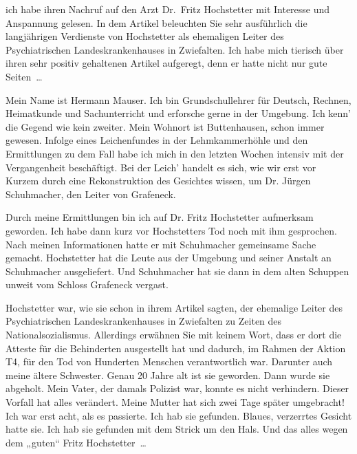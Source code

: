 ich habe ihren Nachruf auf den Arzt Dr.~Fritz Hochstetter mit Interesse und Anspannung gelesen. In
dem Artikel beleuchten Sie sehr ausführlich die langjährigen Verdienste von Hochstetter als
ehemaligen Leiter des Psychiatrischen Landeskrankenhauses in Zwiefalten. Ich habe mich tierisch über
ihren sehr positiv gehaltenen Artikel aufgeregt, denn er hatte nicht nur gute Seiten~…

Mein Name ist Hermann Mauser. Ich bin Grundschullehrer für Deutsch, Rechnen,
Heimatkunde und Sachunterricht und erforsche gerne in der Umgebung.
Ich kenn’ die Gegend wie kein zweiter. Mein Wohnort ist Buttenhausen, schon immer gewesen.
Infolge eines Leichenfundes in der Lehmkammerhöhle
und den Ermittlungen zu dem Fall habe ich mich in den letzten Wochen intensiv mit der Vergangenheit
beschäftigt. Bei der Leich’ handelt es sich, wie wir erst vor Kurzem durch eine Rekonstruktion des
Gesichtes wissen, um Dr. Jürgen Schuhmacher, den Leiter von Grafeneck.

Durch meine Ermittlungen bin ich auf Dr. Fritz Hochstetter aufmerksam geworden. Ich habe dann kurz
vor Hochstetters Tod noch mit ihm gesprochen. Nach meinen Informationen hatte er mit Schuhmacher
gemeinsame Sache gemacht. Hochstetter hat die Leute aus der Umgebung und seiner Anstalt an
Schuhmacher
ausgeliefert. Und Schuhmacher hat sie dann in dem alten Schuppen unweit vom Schloss Grafeneck
vergast.

Hochstetter war, wie sie schon in ihrem Artikel sagten, der ehemalige Leiter des Psychiatrischen
Landeskrankenhauses in Zwiefalten zu Zeiten des Nationalsozialismus. Allerdings erwähnen Sie mit
keinem Wort, dass er dort die Atteste für die Behinderten ausgestellt hat und dadurch, im Rahmen der
Aktion T4, für den Tod von Hunderten Menschen verantwortlich war. Darunter auch meine ältere
Schwester. Genau 20 Jahre alt ist sie geworden. Dann wurde sie abgeholt. Mein Vater, der damals
Polizist war, konnte es nicht verhindern. Dieser Vorfall hat alles verändert. Meine Mutter hat sich
zwei Tage später umgebracht! Ich war erst acht, als es passierte. Ich hab sie gefunden. Blaues,
verzerrtes Gesicht hatte sie. Ich hab sie gefunden mit dem Strick um den Hals. Und das alles wegen
dem „guten“ Fritz Hochstetter~…

